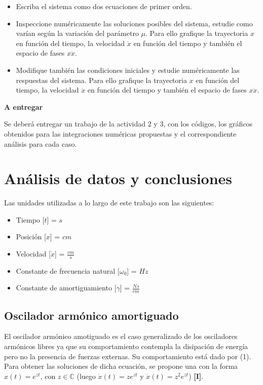 \documentclass[a4paper,12pt]{article}
\begin{document}
\begin{itemize}
\item Escriba el sistema como dos ecuaciones de primer orden.
\item Inspeccione num\'ericamente las soluciones posibles del sistema, estudie como var\'ian seg\'un la variaci\'on del par\'ametro $\mu$. Para ello grafique la trayectoria $x$ en funci\'on del tiempo, la velocidad $\ddot{x}$ en funci\'on del tiempo y tambi\'en el espacio de fases $x  \ddot{x}$.
\item Modifique tambi\'en las condiciones iniciales y estudie num\'ericamente las respuestas del sistema. Para ello grafique la trayectoria $x$ en funci\'on del tiempo, la velocidad $\ddot{x}$ en funci\'on del tiempo y tambi\'en el espacio de fases $x  \ddot{x}$.
\end{itemize}


{\Large \textbf{A entregar}}

Se deber\'a entregar un trabajo de la actividad 2 y 3, con los c\'odigos, los gr\'aficos obtenidos para las integraciones num\'ericas propuestas y el correspondiente an\'alisis para cada caso.


\section{An\'alisis de datos y conclusiones}

Las unidades utilizadas a lo largo de este trabajo son las siguientes:

\begin{itemize}
\item Tiempo [$t$] = $s$
\item Posici\'on [$x$] = $cm$
\item Velocidad [$\dot{x}$] = $\frac{cm}{s}$
\item Constante de frecuencia natural [$\omega_0$] = $Hz$
\item Constante de amortiguamiento [$\gamma$] = $\frac{Ns}{cm}$
\end{itemize}

\subsection{Oscilador arm\'onico amortiguado}

El oscilador arm\'onico amotiguado es el caso generalizado de los osciladores arm\'onicos libres ya que su comportamiento contempla la disipaci\'on de energ\'ia pero no la presencia de fuerzas externas. Su comportamiento est\'a dado por (1).
Para obtener las soluciones de dicha ecuaci\'on, se propone una con la forma $x(t) = e^{zt}$, con $z \in \mathbb{C}$ (luego $\dot{x}(t) = ze^{zt}$ y $\ddot{x}(t) = z^2e^{zt}$) \textbf{[I]}.
\end{document}

